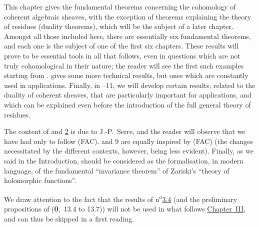 This chapter gives the fundamental theorems concerning the cohomology of coherent algebraic sheaves, with the exception of theorems explaining the theory of residues (duality theorems), which will be the subject of a later chapter.
Amongst all those included here, there are essentially six fundamental theorems, and each one is the subject of one of the first six chapters.
These results will prove to be essential tools in all that follows, even in questions which are not truly cohomological in their nature;
the reader will see the first such examples starting from \hyperref[section:III.4]{}.
\hyperref[section:III.7]{} gives some more technical results, but ones which are constantly used in applications.
Finally, in \textsection{}--11, we will develop certain results, related to the duality of coherent sheaves, that are particularly important for applications, and which can be explained even before the introduction of the full general theory of residues.

The content of \textsection\hyperref[section:III.1]{} and \hyperref[section:III.2]{2} is due to J.-P.~Serre, and the reader will observe that we have had only to follow (FAC).
 and 9 are equally inspired by (FAC) (the changes necessitated by the different contexts, however, being less evident).
Finally, as we said in the Introduction, \hyperref[section:III.4]{} should be considered as the formalisation, in modern language, of the fundamental ``invariance theorem'' of Zariski's ``theory of holomorphic functions''.

We draw attention to the fact that the results of n\textsuperscript{o}\hyperref[subsection:III.3.4]{3.4} (and the preliminary propositions of (\textbf{0},~13.4 to 13.7)) will not be used in what follows \hyperref[section:ega3]{Chapter~III}, and can thus be skipped in a first reading.
\bigskip













